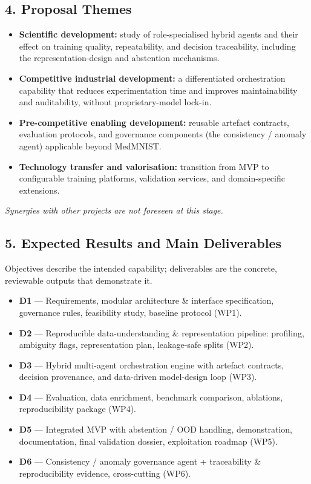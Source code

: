 \documentclass[11pt,a4paper]{article}
\begin{document}
\subsection*{4. Proposal Themes}
\begin{itemize}
\item \textbf{Scientific development:} study of role-specialised hybrid agents and their effect on training quality, repeatability, and decision traceability, including the representation-design and abstention mechanisms.
\item \textbf{Competitive industrial development:} a differentiated orchestration capability that reduces experimentation time and improves maintainability and auditability, without proprietary-model lock-in.
\item \textbf{Pre-competitive enabling development:} reusable artefact contracts, evaluation protocols, and governance components (the consistency / anomaly agent) applicable beyond MedMNIST.
\item \textbf{Technology transfer and valorisation:} transition from MVP to configurable training platforms, validation services, and domain-specific extensions.
\end{itemize}
\noindent\textit{Synergies with other projects are not foreseen at this stage.}

\subsection*{5. Expected Results and Main Deliverables}
Objectives describe the intended capability; deliverables are the concrete, reviewable outputs that demonstrate it.
\begin{itemize}
\item \textbf{D1} --- Requirements, modular architecture \& interface specification, governance rules, feasibility study, baseline protocol (WP1).
\item \textbf{D2} --- Reproducible data-understanding \& representation pipeline: profiling, ambiguity flags, representation plan, leakage-safe splits (WP2).
\item \textbf{D3} --- Hybrid multi-agent orchestration engine with artefact contracts, decision provenance, and data-driven model-design loop (WP3).
\item \textbf{D4} --- Evaluation, data enrichment, benchmark comparison, ablations, reproducibility package (WP4).
\item \textbf{D5} --- Integrated MVP with abstention / OOD handling, demonstration, documentation, final validation dossier, exploitation roadmap (WP5).
\item \textbf{D6} --- Consistency / anomaly governance agent + traceability \& reproducibility evidence, cross-cutting (WP6).
\end{itemize}
\end{document}

